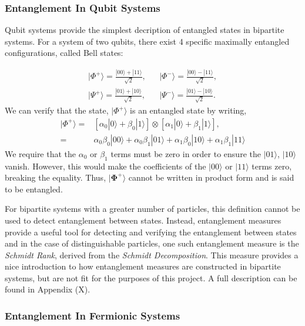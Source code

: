 \subsubsection{Entanglement In Qubit Systems}
Qubit systems provide the simplest decription of entangled states in bipartite systems. For a system of two qubits, there exist 4 specific maximally entangled configurations, called Bell states: 

\begin{align*}
    |\Phi^{+}\rangle = \frac{|00\rangle + |11\rangle }{\sqrt{2}}, && |\Phi^{-}\rangle = \frac{|00\rangle - |11\rangle }{\sqrt{2}},
    \\
    |\Psi^{+}\rangle = \frac{|01\rangle + |10\rangle }{\sqrt{2}}, && |\Psi^{-}\rangle = \frac{|01\rangle - |10\rangle }{\sqrt{2}}.
\end{align*}
We can verify that the state, $|\Phi^{+}\rangle $ is an entangled state by writing, 
\begin{align*}
    |{\Phi}^+\rangle = & \left[ \alpha_0 |0\rangle + \beta_0|1\rangle\right] \otimes \left[\alpha_1 |0\rangle + \beta_1|1\rangle\right], \\
    =                     & \alpha_0\beta_0 |00\rangle + \alpha_0\beta_1|01\rangle + \alpha_1\beta_0|10\rangle + \alpha_1\beta_1|11\rangle
\end{align*}
We require that the $\alpha_0$ or $\beta_1$ terms must be zero in order to ensure the $|01\rangle$, $|10\rangle$ vanish. However, this would make the coefficients of the $|00\rangle$ or $|11\rangle$ terms zero, breaking the equality. Thus, $|{\bm\Phi}^+\rangle$ cannot be written in product form and is said to be entangled.

For bipartite systems with a greater number of particles, this definition cannot be used to detect entanglement between states. Instead,  entanglement measures provide a useful tool for detecting and verifying the entanglement between states and in the case of distinguishable particles, one such entanglement measure is the \textit{Schmidt Rank}, derived from the \textit{Schmidt Decomposition}. This measure provides a nice introduction to how entanglement measures are constructed in bipartite systems, but are not fit for the purposes of this project. A full description can be found in Appendix (X). 





\subsubsection{Entanglement In Fermionic Systems}

